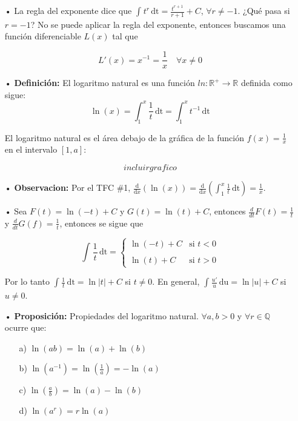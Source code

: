 \documentclass[pts12]{article}
\numberwithin{equation}{section}
\newcommand{\Col}{\color{ProcessBlue}}
\newcommand{\xinteg}[4]{\int_{#1}^{#2} \! {#3} \, \mathrm{#4}}
\newcommand{\derivate}[2]{\frac{\mathrm{d}}{\mathrm{d}#1} \left(  {#2}  \right)  }
\begin{document}
\begin{itemize}
\item[\Col •] La regla del exponente dice que $\int_{}^{} \! {t^r} \, \mathrm{dt}=\frac{t^{r+1}}{r+1}+C$, $\forall r\neq -1$. ¿Qué pasa si $r=-1$? No se puede aplicar la regla del exponente, entonces buscamos una función diferenciable $L(x)$ tal que 

$$ L'(x)=x^{-1}=\frac{1}{x} \quad \forall x\neq 0 $$

\item[\Col •] \textbf{Definición:} El logaritmo natural es una función $ln:\mathbb{R^+}\longrightarrow\mathbb{R}$ definida como sigue:
$$ \ln(x)=\xinteg{1}{x}{\frac{1}{t}}{dt}=\xinteg{1}{x}{t^{-1}}{dt}$$ 

El logaritmo natural es el área debajo de la gráfica de la función $f(x)=\frac{1}{x}$ en el intervalo $[1,a]$:

$$ incluirgrafico $$ 

\item[\Col •] \textbf{Observacion:} Por el TFC \#1, $\derivate{x}{\ln(x)}=   \derivate{x}{\xinteg{1}{x}{\frac{1}{t}}{dt}}=\frac{1}{x}$.

\item[\Col •] Sea $F(t)=\ln(-t)+C$ y $G(t)=\ln(t)+C$, entonces $\frac{d}{dt}F(t)=\frac{1}{t}$ y $\frac{d}{dt}G(f)=\frac{1}{t}$, entonces se sigue que 

$$ \xinteg{}{}{\frac{1}{t}}{dt}= \left\{
 \begin{array}{ll}
  \ln(-t)+C  & \mbox{si } t<0 \\
  \\ \ln(t)+C & \mbox{si } t>0
 \end{array}
\right.$$

Por lo tanto $\xinteg{}{}{\frac{1}{t}}{dt}=\ln|t|+C$ si $t\neq 0$. En general, $\xinteg{}{}{\frac{u'}{u}}{du}=\ln|u|+C$ si $u\neq 0$.

\item[\Col •] \textbf{Proposición:} Propiedades del logaritmo natural. $\forall a,b>0$ y $\forall r\in\mathbb{Q}$ ocurre que:
\begin{enumerate}
\item[a)] $\ln(ab)=\ln(a)+\ln(b)$
\item[b)] $\ln(a^{-1})=\ln\left(\frac{1}{a}\right)=-\ln(a)$
\item[c)] $\ln\left(\frac{a}{b}\right)=\ln(a)-\ln(b)$
\item[d)] $\ln(a^r)=r\ln(a)$
\end{enumerate}


\end{itemize}
\end{document}
